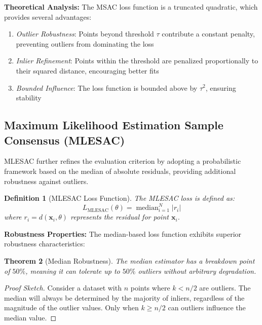 \documentclass[12pt]{article}
\renewcommand{\vec}[1]{\mathbf{#1}}
\DeclareMathOperator{\median}{median}
\newtheorem{theorem}{Theorem}[section]
\newtheorem{definition}[theorem]{Definition}
\begin{document}

\textbf{Theoretical Analysis:} The MSAC loss function is a truncated quadratic, which provides several advantages:
\begin{enumerate}
    \item \textit{Outlier Robustness}: Points beyond threshold $\tau$ contribute a constant penalty, preventing outliers from dominating the loss
    \item \textit{Inlier Refinement}: Points within the threshold are penalized proportionally to their squared distance, encouraging better fits
    \item \textit{Bounded Influence}: The loss function is bounded above by $\tau^2$, ensuring stability
\end{enumerate}

\subsection{Maximum Likelihood Estimation Sample Consensus (MLESAC)}
\label{subsec:mlesac}

MLESAC further refines the evaluation criterion by adopting a probabilistic framework based on the median of absolute residuals, providing additional robustness against outliers.

\begin{definition}[MLESAC Loss Function]
    \label{def:mlesac_loss}
    The MLESAC loss is defined as:
    \begin{equation}
        L_{\text{MLESAC}}(\theta) = \median_{i=1}^N |r_i|
        \label{eq:mlesac_loss}
    \end{equation}
    where $r_i = d(\vec{x}_i, \theta)$ represents the residual for point $\vec{x}_i$.
\end{definition}

\textbf{Robustness Properties:} The median-based loss function exhibits superior robustness characteristics:

\begin{theorem}[Median Robustness]
    \label{thm:median_robustness}
    The median estimator has a breakdown point of $50\%$, meaning it can tolerate up to $50\%$ outliers without arbitrary degradation.
\end{theorem}

\begin{proof}[Proof Sketch]
    Consider a dataset with $n$ points where $k < n/2$ are outliers. The median will always be determined by the majority of inliers, regardless of the magnitude of the outlier values. Only when $k \geq n/2$ can outliers influence the median value.
\end{proof}
\end{document}
